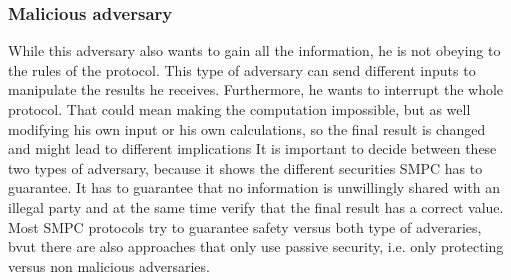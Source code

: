 \documentclass[english,runningheads,a4paper]{llncs}[2018/03/10]
\begin{document}
\subsubsection{Malicious adversary}
While this adversary also wants to gain all the information, he is not obeying to the rules of the protocol. This type of adversary can send different inputs to manipulate the results he receives. Furthermore, he wants to interrupt the whole protocol. That could mean making the computation impossible, but as well modifying his own input or his own calculations, so the final result is changed and might lead to different implications
It is important to decide between these two types of adversary, because it shows the different securities SMPC has to guarantee. It has to guarantee that no information is unwillingly shared with an illegal party and at the same time verify that the final result has a correct value. Most SMPC protocols try to guarantee safety versus both type of adveraries, bvut there are also approaches that only use passive security, i.e. only protecting versus non malicious adversaries.
\end{document}
